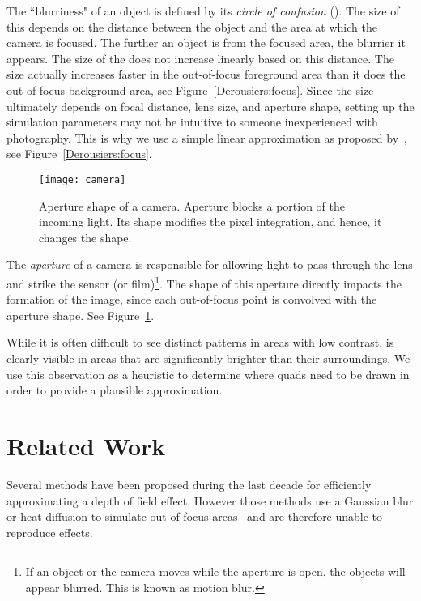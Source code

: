 The ``blurriness" of an object is defined by its \emph{circle of confusion} (\coc). The size of this \coc depends on the distance between the object and the area at which the camera is focused. The further an object is from the focused area, the blurrier it appears. The size of the \coc does not increase linearly based on this distance. The size actually increases faster in the out-of-focus foreground area than it does the out-of-focus background area, see Figure~\ref{Derousiers:focus}. Since the \coc size ultimately depends on focal distance, lens size, and aperture shape, setting up the simulation parameters may not be intuitive to someone inexperienced with photography. This is why we use a simple linear approximation as proposed by~\cite{Hammon07}, see Figure~\ref{Derousiers:focus}.

	\begin{figure}[htb]\centering
	\texttt{[image: camera]}
	\caption{Aperture shape of a camera. Aperture blocks a portion of the incoming light. Its shape modifies the pixel integration, and hence, it changes the \bokeh shape. }
	\label{Derousiers:camera}
	\end{figure}

The \textit{aperture} of a camera is responsible for allowing light to pass through the lens and strike the sensor (or film)\footnote{If an object or the camera moves while the aperture is open, the objects will appear blurred. This is known as motion blur.}. The shape of this aperture directly impacts the formation of the image, since each out-of-focus point is convolved with the aperture shape. See Figure~\ref{Derousiers:camera}.

While it is often difficult to see distinct \bokeh patterns in areas with low contrast, \bokeh is clearly visible in areas that are significantly brighter than their surroundings. We use this observation as a heuristic to determine where \bokeh quads need to be drawn in order to provide a plausible approximation.

\section{Related Work}\label{Derousiers:RelativeWork}

Several methods have been proposed during the last decade for efficiently approximating a depth of field effect. However those methods use a Gaussian blur or heat diffusion to simulate out-of-focus areas~\cite{Hammon07,Lee09,Kosloff07} and are therefore unable to reproduce \bokeh effects.

